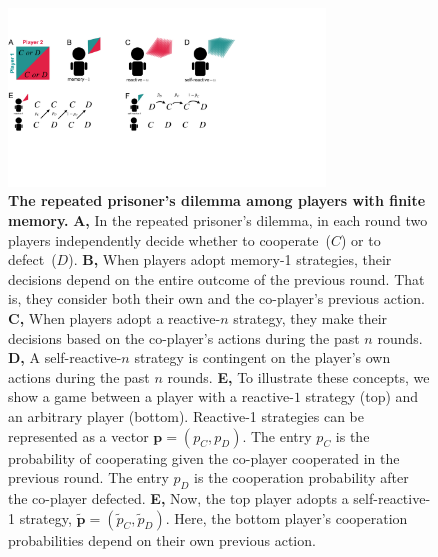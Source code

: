 \documentclass[11pt]{article}
\begin{document}
{\setlength{\bibsep}{0\baselineskip}


}


\clearpage
\newpage

\begin{figure}[t]
  \centering
  \includegraphics[width=0.75\textwidth]{figures/conceptual_figure.pdf}
  \caption{\textbf{The repeated prisoner's dilemma among players with finite memory.}
  \textbf{A,} In the repeated prisoner's dilemma, in each round two players independently decide whether to cooperate~($C$) or to defect~($D$). 
   \textbf{B,} When players adopt memory-1 strategies, their decisions depend on the entire outcome of the previous round. That is, they consider both their own and the co-player's previous action. 
   \textbf{C,} When players adopt a reactive-$n$ strategy, they make their decisions based on the co-player's actions during the past $n$ rounds. 
   \textbf{D,} A self-reactive-$n$ strategy is contingent on the player's own actions during the past $n$ rounds. 
   \textbf{E,} To illustrate these concepts, we show a game between a player with a reactive-$1$ strategy (top) and an arbitrary player (bottom). 
   Reactive-1 strategies can be represented as a vector  $\mathbf{p} \!=\! (p_C, p_D)$. 
   The entry $p_C$ is the probability of cooperating given the co-player cooperated in the previous round.
   The entry $p_D$ is the cooperation probability after the co-player defected. 
   \textbf{E,} Now, the top player adopts a self-reactive-1 strategy, $\mathbf{\tilde p}\!=\!(\tilde p_C, \tilde p_D)$. 
   Here, the bottom player's cooperation probabilities depend on their own previous action.
   }\label{fig:conceptual_figure_model}
\end{figure}
\end{document}
